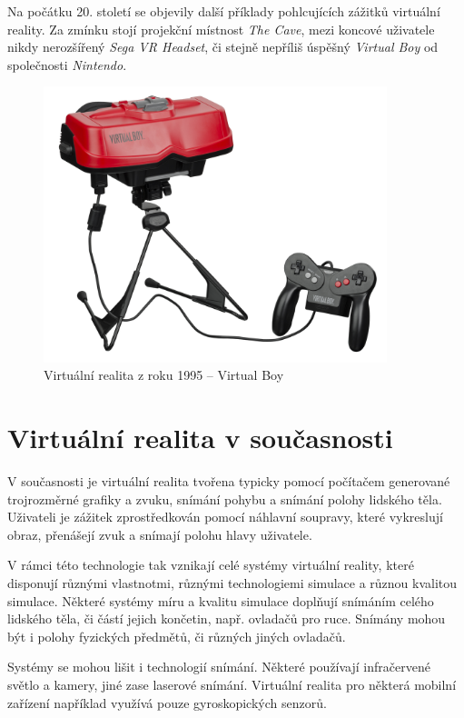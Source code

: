 Na počátku 20. století se objevily další příklady pohlcujících zážitků
virtuální reality. Za zmínku stojí projekční místnost \emph{The Cave},
mezi koncové uživatele nikdy nerozšířený \emph{Sega VR Headset}, či
stejně nepříliš úspěšný \emph{Virtual Boy} od společnosti
\emph{Nintendo}.

\begin{figure}
\centering
\includegraphics[width=10cm]{src/assets/virtual-boy.jpg}
\caption{Virtuální realita z roku 1995 -- Virtual Boy\autocite{virtualboypic}}
\end{figure}

\section{Virtuální realita v
současnosti}\label{virtuuxe1lnuxed-realita-v-souux10dasnosti}

V současnosti je virtuální realita tvořena typicky pomocí počítačem
generované trojrozměrné grafiky a zvuku, snímání pohybu a snímání polohy
lidského těla. Uživateli je zážitek zprostředkován pomocí náhlavní
soupravy, které vykreslují obraz, přenášejí zvuk a snímají polohu hlavy
uživatele. \autocite{vrnow}

V rámci této technologie tak vznikají celé systémy virtuální reality,
které disponují různými vlastnotmi, různými technologiemi simulace a
různou kvalitou simulace. Některé systémy míru a kvalitu simulace
doplňují snímáním celého lidského těla, či částí jejich končetin, např.
ovladačů pro ruce. Snímány mohou být i polohy fyzických předmětů, či
různých jiných ovladačů. 

Systémy se mohou lišit i technologií snímání.
Některé používají infračervené světlo a kamery, jiné zase laserové
snímání. Virtuální realita pro některá mobilní zařízení například
využívá pouze gyroskopických senzorů.


